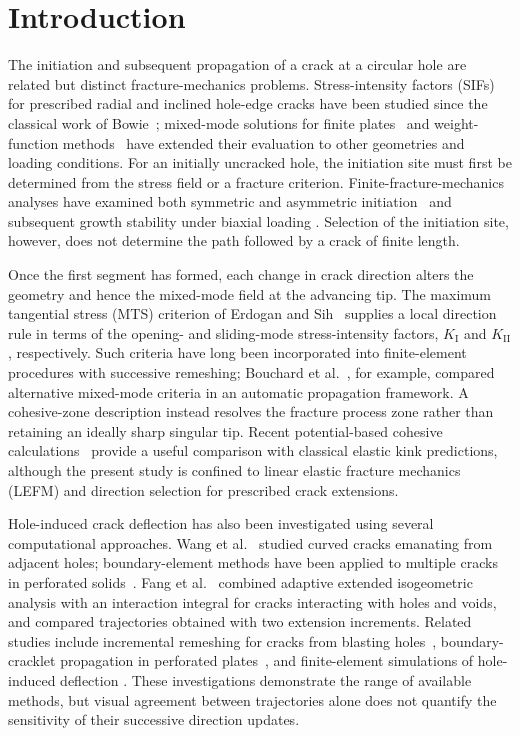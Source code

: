 \documentclass[pdflatex,sn-mathphys-num]{sn-jnl}
\begin{document}
\section{Introduction}
The initiation and subsequent propagation of a crack at a circular hole
are related but distinct fracture-mechanics problems. Stress-intensity
factors (SIFs) for prescribed radial and inclined hole-edge cracks have been
studied since the classical work of Bowie~\cite{Bowie1956}; mixed-mode
solutions for finite plates~\cite{WooWangCheung1989} and weight-function
methods~\cite{XuEtAl2018} have extended their evaluation to other
geometries and loading conditions. For an initially uncracked hole,
the initiation site must first be determined from the stress field or a
fracture criterion. Finite-fracture-mechanics analyses have examined
both symmetric and asymmetric initiation~\cite{SaporaEtAl2018} and
subsequent growth stability under biaxial loading
\cite{SaporaCornetti2018}. Selection of the initiation site, however,
does not determine the path followed by a crack of finite length.

Once the first segment has formed, each change in crack direction
alters the geometry and hence the mixed-mode field at the advancing
tip. The maximum tangential stress (MTS) criterion of Erdogan and
Sih~\cite{ErdoganSih1963} supplies a local direction rule in terms of
the opening- and sliding-mode stress-intensity factors,
$K_{\mathrm{I}}$ and $K_{\mathrm{II}}$, respectively. Such criteria
have long been incorporated into finite-element procedures with
successive remeshing; Bouchard et al.~\cite{BouchardEtAl2003},
for example, compared alternative mixed-mode criteria in an
automatic propagation framework. A cohesive-zone description
instead resolves the fracture process zone rather than retaining
an ideally sharp singular tip. Recent potential-based cohesive
calculations~\cite{BogdanovSelivanov2026} provide a useful
comparison with classical elastic kink predictions, although the
present study is confined to linear elastic fracture mechanics
(LEFM) and direction selection for prescribed crack extensions.

Hole-induced crack deflection has also been investigated using
several computational approaches. Wang et al.~\cite{WangMeguidPapanikos1999}
studied curved cracks emanating from adjacent holes; boundary-element
methods have been applied to multiple cracks in perforated
solids~\cite{LiuLiXie2017}. Fang et al.~\cite{FangEtAl2020}
combined adaptive extended isogeometric analysis with an
interaction integral for cracks interacting with holes and voids,
and compared trajectories obtained with two extension increments.
Related studies include incremental remeshing for cracks from
blasting holes~\cite{YangEtAl2020}, boundary-cracklet
propagation in perforated plates~\cite{AhmedEtAl2021}, and
finite-element simulations of hole-induced deflection
\cite{AlshoaibiFageehi2022}. These investigations demonstrate
the range of available methods, but visual agreement between
trajectories alone does not quantify the sensitivity of their
successive direction updates.
\end{document}
